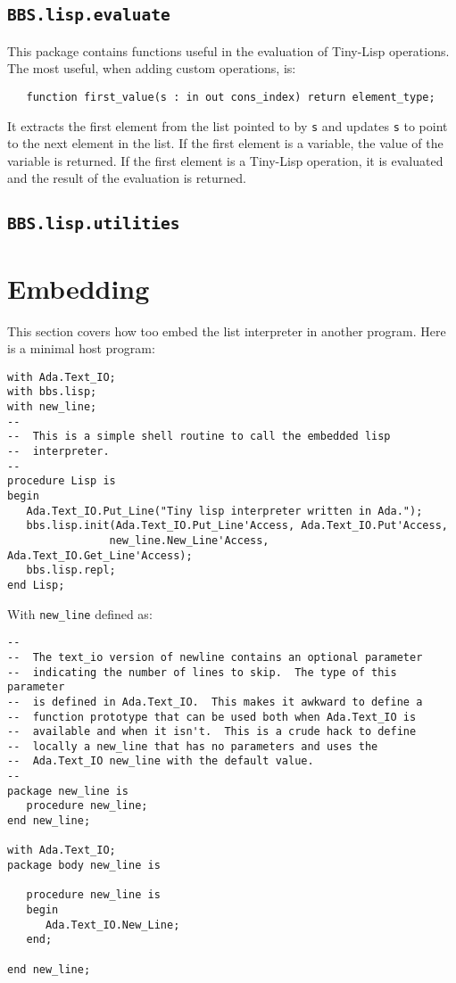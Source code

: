 \documentclass[10pt, openany]{book}
\newcommand{\package}[1]{\texttt{#1}}
\newcommand{\function}[1]{\texttt{#1}}
\newcommand{\keyword}[1]{\texttt{#1}}
\newcommand{\tl}{Tiny-Lisp}
\begin{document}
\subsection{\package{BBS.lisp.evaluate}}
This package contains functions useful in the evaluation of \tl{} operations.  The most useful, when adding custom operations, is:
\begin{lstlisting}
   function first_value(s : in out cons_index) return element_type;
\end{lstlisting}
It extracts the first element from the list pointed to by \keyword{s} and updates \keyword{s} to point to the next element in the list.  If the first element is a variable, the value of the variable is returned.  If the first element is a \tl{} operation, it is evaluated and the result of the evaluation is returned.

\subsection{\package{BBS.lisp.utilities}}

\section{Embedding}
This section covers how too embed the list interpreter in another program.  Here is a minimal host program:
\begin{lstlisting}
with Ada.Text_IO;
with bbs.lisp;
with new_line;
--
--  This is a simple shell routine to call the embedded lisp
--  interpreter.
--
procedure Lisp is
begin
   Ada.Text_IO.Put_Line("Tiny lisp interpreter written in Ada.");
   bbs.lisp.init(Ada.Text_IO.Put_Line'Access, Ada.Text_IO.Put'Access,
                new_line.New_Line'Access, Ada.Text_IO.Get_Line'Access);
   bbs.lisp.repl;
end Lisp;
\end{lstlisting}

With \function{new\_line} defined as:
\begin{lstlisting}
--
--  The text_io version of newline contains an optional parameter
--  indicating the number of lines to skip.  The type of this parameter
--  is defined in Ada.Text_IO.  This makes it awkward to define a
--  function prototype that can be used both when Ada.Text_IO is
--  available and when it isn't.  This is a crude hack to define
--  locally a new_line that has no parameters and uses the
--  Ada.Text_IO new_line with the default value.
--
package new_line is
   procedure new_line;
end new_line;

with Ada.Text_IO;
package body new_line is

   procedure new_line is
   begin
      Ada.Text_IO.New_Line;
   end;

end new_line;
\end{lstlisting}
\end{document}
